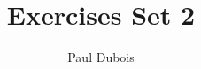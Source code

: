 \documentclass[]{article}
\title{Exercises Set 2}
\author{Paul Dubois}
\begin{document}
\maketitle

\begin{abstract}

\end{abstract}

\section{}
\end{document}
